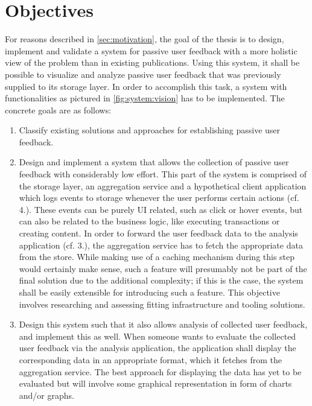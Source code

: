 %
\chapter{Objectives}
\label{sec:objectives}

For reasons described in \cref{sec:motivation}, the goal of the thesis is to design, implement and validate a system for passive user feedback with a more holistic view of the problem than in existing publications.
Using this system, it shall be possible to visualize and analyze passive user feedback that was previously supplied to its storage layer.
In order to accomplish this task, a system with functionalities as pictured in \cref{fig:system:vision} has to be implemented.
The concrete goals are as follows:

\begin{enumerate}
\item Classify existing solutions and approaches for establishing passive user feedback.
\item Design and implement a system that allows the collection of passive user feedback with considerably low effort.
This part of the system is comprised of the storage layer, an aggregation service and a hypothetical client application which logs events to storage whenever the user performs certain actions (cf. 4.).
These events can be purely UI related, such as click or hover events, but can also be related to the business logic, like executing transactions or creating content.
In order to forward the user feedback data to the analysis application (cf. 3.), the aggregation service has to fetch the appropriate data from the store.
While making use of a caching mechanism during this step would certainly make sense, such a feature will presumably not be part of the final solution due to the additional complexity; if this is the case, the system shall be easily extensible for introducing such a feature.
This objective involves researching and assessing fitting infrastructure and tooling solutions.
\item Design this system such that it also allows analysis of collected user feedback, and implement this as well.
When someone wants to evaluate the collected user feedback via the analysis application, the application shall display the corresponding data in an appropriate format, which it fetches from the aggregation service.
The best approach for displaying the data has yet to be evaluated but will involve some graphical representation in form of charts and/or graphs.

\end{enumerate}
